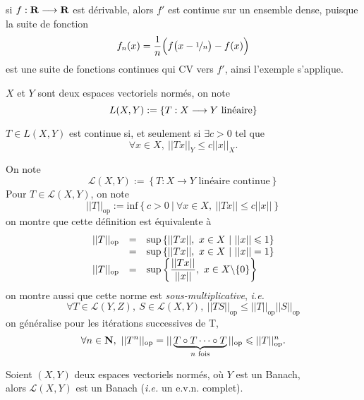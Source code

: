 \documentclass[a4paper,11pt, twoside]{article}
\begin{document}
\begin{RQ}
  si $f:\mathbf R\longrightarrow \mathbf R$ est dérivable, alors $f'$ est continue sur un ensemble dense, puisque la suite de fonction 
  $$f_n(x)=\frac{1}{n}\Big(f\big(x-\nicefrac{1}{n}\big)-f(x)\Big)$$
  est une suite de fonctions continues qui CV vers $f'$, ainsi l'exemple s'applique.
\end{RQ}





$X$ et $Y$ sont deux espaces vectoriels normés, on note 
$$L(X,Y):=\left\{T:X\longrightarrow Y\text{ linéaire}\right\}$$

$T\in L(X,Y)$ est continue si, et seulement si $\exists c>0$ tel que
$$\forall x\in X,\ ||Tx||_Y\leqslant c||x||_X.$$

On note 
$$\mathcal L(X,Y):=\left\{T:X\longrightarrow Y\text{ linéaire continue}\right\}$$
Pour $T\in\mathcal L(X,Y)$, on note
$$||T||_{\mathrm{op}}:=\mathrm{inf}\left\{c>0\ |\ \forall x\in X,\ ||Tx||\leqslant c||x||\right\}$$
on montre que cette définition est équivalente à
$$\begin{array}{rcl}
  ||T||_{\mathrm{op}}&=&\mathrm{sup}\left\{||Tx||,\ x\in X\ |\ ||x||\leqslant 1\right\}\\
  &=&\mathrm{sup}\left\{||Tx||,\ x\in X\ |\ ||x||= 1\right\}\\
  ||T||_{\mathrm{op}}&=&\mathrm{sup}\left\{\dstyle\frac{||Tx||}{||x||},\ x\in X\backslash\{0\}\right\}
\end{array}$$
on montre aussi que cette norme est \emph{sous-multiplicative}, \emph{i.e.}
$$\forall T\in\mathcal L(Y,Z),\ S\in\mathcal L(X,Y),\ ||TS||_{\mathrm{op}}\leqslant ||T||_{\mathrm{op}} ||S||_{\mathrm{op}}$$
on généralise pour les itérations successives de T,
$$\forall n\in\N,\ ||T^n||_{\mathrm{op}}=||\underbrace{T\circ T\cdots\circ T}_{n\text{ fois}}||_{\mathrm{op}}\leqslant ||T||_{\mathrm{op}}^n.$$

\begin{prop}
  Soient $(X,Y)$ deux espaces vectoriels normés, où $Y$ est un Banach,\\

  alors $\mathcal L(X,Y)$ est un Banach (\emph{i.e.} un e.v.n. complet).
\end{prop}
\end{document}
